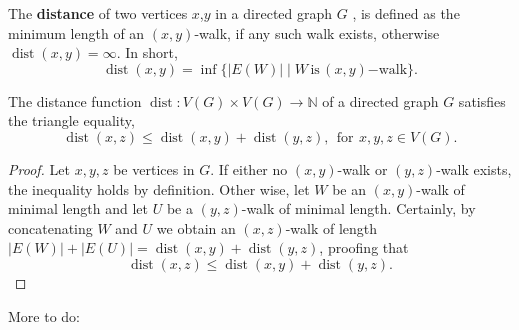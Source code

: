 \begin{defn}[Distance]
The \textbf{distance} of two vertices $x$,$y$ in a directed graph $G$ , is defined as the minimum length of an $(x,y)$-walk, if any such walk exists, otherwise $\operatorname{dist}(x,y)=\infty$. In short,
\[
\operatorname{dist}(x,y) = \inf \{|E(W)| \mid W\,\mathrm{is}\,(x,y)\mathrm{-walk}\}.
\]
\end{defn}

\begin{proposition}
The distance function $\operatorname{dist}: V(G) \times V(G) \to \mathbb{N}$ of a directed graph $G$ satisfies the triangle equality,
\[
\operatorname{dist}(x,z) \le \operatorname{dist}(x,y) + \operatorname{dist}(y,z), \:\: \mathrm{for}\:\, x,y,z \in V(G).
\]
\end{proposition}

\begin{proof}
Let $x,y,z$ be vertices in $G$. If either no $(x,y)$-walk or $(y,z)$-walk exists, the inequality holds by definition. Other wise, let $W$ be an $(x,y)$-walk of minimal length and let $U$ be a $(y,z)$-walk of minimal length. Certainly, by concatenating $W$ and $U$ we obtain an $(x,z)$-walk of length $|E(W)| + |E(U)| = \operatorname{dist}(x,y) + \operatorname{dist}(y,z)$, proofing that \[
\operatorname{dist}(x,z) \le \operatorname{dist}(x,y) + \operatorname{dist}(y,z).
\]
\end{proof}

More to do:

